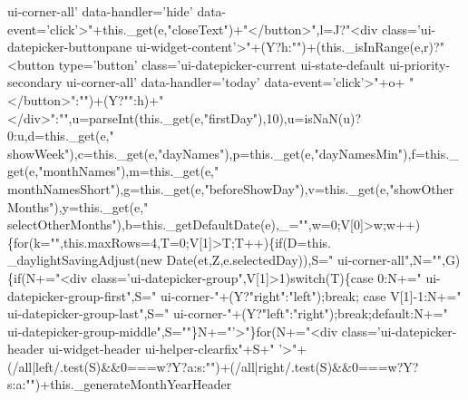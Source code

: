 \begin{DoxyCode}
{       ui-corner-all' data-handler='hide' data-event='click'>"}+this.\_get(e,\textcolor{stringliteral}{"closeText"})+\textcolor{stringliteral}{"</button>"},l=J?\textcolor{stringliteral}{"<div
       class='ui-datepicker-buttonpane ui-widget-content'>"}+(Y?h:\textcolor{stringliteral}{""})+(this.\_isInRange(e,r)?\textcolor{stringliteral}{"<button type='button'
       class='ui-datepicker-current ui-state-default ui-priority-secondary ui-corner-all' data-handler='today' data-event='click'>"}+o+\textcolor{stringliteral}{
      "</button>"}:\textcolor{stringliteral}{""})+(Y?\textcolor{stringliteral}{""}:h)+\textcolor{stringliteral}{"</div>"}:\textcolor{stringliteral}{""},u=parseInt(this.\_get(e,\textcolor{stringliteral}{"firstDay"}),10),u=isNaN(u)?0:u,d=this.\_get(e,\textcolor{stringliteral}{"
      showWeek"}),c=this.\_get(e,\textcolor{stringliteral}{"dayNames"}),p=this.\_get(e,\textcolor{stringliteral}{"dayNamesMin"}),f=this.\_get(e,\textcolor{stringliteral}{"monthNames"}),m=this.\_get(e,\textcolor{stringliteral}{"
      monthNamesShort"}),g=this.\_get(e,\textcolor{stringliteral}{"beforeShowDay"}),v=this.\_get(e,\textcolor{stringliteral}{"showOtherMonths"}),y=this.\_get(e,\textcolor{stringliteral}{"
      selectOtherMonths"}),b=this.\_getDefaultDate(e),\_=\textcolor{stringliteral}{""},w=0;V[0]>w;w++)\{\textcolor{keywordflow}{for}(k=\textcolor{stringliteral}{""},this.maxRows=4,T=0;V[1]>T;T++)\{\textcolor{keywordflow}{if}(D=this.
      \_daylightSavingAdjust(\textcolor{keyword}{new} Date(et,Z,e.selectedDay)),S=\textcolor{stringliteral}{" ui-corner-all"},N=\textcolor{stringliteral}{""},G)\{\textcolor{keywordflow}{if}(N+=\textcolor{stringliteral}{"<div
       class='ui-datepicker-group"},V[1]>1)\textcolor{keywordflow}{switch}(T)\{\textcolor{keywordflow}{case} 0:N+=\textcolor{stringliteral}{" ui-datepicker-group-first"},S=\textcolor{stringliteral}{" ui-corner-"}+(Y?\textcolor{stringliteral}{"right"}:\textcolor{stringliteral}{"left"});\textcolor{keywordflow}{break};\textcolor{keywordflow}{
      case} V[1]-1:N+=\textcolor{stringliteral}{" ui-datepicker-group-last"},S=\textcolor{stringliteral}{" ui-corner-"}+(Y?\textcolor{stringliteral}{"left"}:\textcolor{stringliteral}{"right"});\textcolor{keywordflow}{break};\textcolor{keywordflow}{default}:N+=\textcolor{stringliteral}{"
       ui-datepicker-group-middle"},S=\textcolor{stringliteral}{""}\}N+=\textcolor{stringliteral}{"'>"}\}\textcolor{keywordflow}{for}(N+=\textcolor{stringliteral}{"<div class='ui-datepicker-header ui-widget-header ui-helper-clearfix"}+S+\textcolor{stringliteral}{"
      '>"}+(/all|left/.test(S)&&0===w?Y?a:s:\textcolor{stringliteral}{""})+(/all|right/.test(S)&&0===w?Y?s:a:\textcolor{stringliteral}{""})+this.\_generateMonthYearHeader

\end{DoxyCode}
